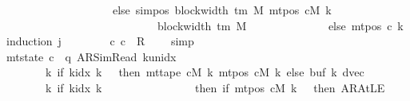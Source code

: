 \begin{isabellebody}
\ \ \ \ \ \ \ \ \ \ \ \ \ \ \ \ \ \ \ \ else\ sim{\isacharunderscore}{\kern0pt}pos\ {\isacharparenleft}{\kern0pt}block{\isacharunderscore}{\kern0pt}width\ {\isacharparenleft}{\kern0pt}{\isasymGamma}{\isacharunderscore}{\kern0pt}tm\ M{\isacharparenright}{\kern0pt}{\isacharparenright}{\kern0pt}\ {\isacharparenleft}{\kern0pt}mt{\isacharunderscore}{\kern0pt}pos\ cM\ k{\isacharparenright}{\kern0pt}\isanewline
\ \ \ \ \ \ \ \ \ \ \ \ \ \ \ \ \ \ \ \ \ \ \ \ \ \ \ {\isacharplus}{\kern0pt}\ block{\isacharunderscore}{\kern0pt}width\ {\isacharparenleft}{\kern0pt}{\isasymGamma}{\isacharunderscore}{\kern0pt}tm\ M{\isacharparenright}{\kern0pt}{\isacharparenright}{\kern0pt}\isanewline
\ \ \ \ \ \ \ \ \ \ \ \ \ \ else\ mt{\isacharunderscore}{\kern0pt}pos\ c{}\ k{\isacharparenright}{\kern0pt}{\isacharparenright}{\kern0pt}{\isachardoublequoteclose}\isanewline
%
\isadelimproof
%
\endisadelimproof
%
\isatagproof
{}\isamarkupfalse%
\ {\isacharparenleft}{\kern0pt}induction\ j{\isacharparenright}{\kern0pt}\isanewline
\ \ \isamarkupfalse%
\ {}\isanewline
\ \ \isamarkupfalse%
\ {\isachardoublequoteopen}{\isacharparenleft}{\kern0pt}c{}{\isacharcomma}{\kern0pt}\ c{}{\isacharparenright}{\kern0pt}\ {\isasymin}\ R{\isacharprime}{\kern0pt}\ {\isacharcircum}{\kern0pt}{\isacharcircum}{\kern0pt}\ {}{\isachardoublequoteclose}\ \isamarkupfalse%
\ simp\isanewline
\ \ \isamarkupfalse%
\ \isamarkupfalse%
\ {\isachardoublequoteopen}mt{\isacharunderscore}{\kern0pt}state\ c{}\ {\isacharequal}{\kern0pt}\ {\isacharparenleft}{\kern0pt}q{\isacharcomma}{\kern0pt}\ AR{\isacharunderscore}{\kern0pt}SimRead{\isacharcomma}{\kern0pt}\ k{\isacharunderscore}{\kern0pt}unidx\ {}{\isacharcomma}{\kern0pt}\ {}{\isacharcomma}{\kern0pt}\isanewline
\ \ \ \ \ \ \ \ {\isacharparenleft}{\kern0pt}{\isasymlambda}k{\isachardot}{\kern0pt}\ if\ k{\isacharunderscore}{\kern0pt}idx\ k\ {\isacharless}{\kern0pt}\ {}\ then\ mt{\isacharunderscore}{\kern0pt}tape\ cM\ k\ {\isacharparenleft}{\kern0pt}mt{\isacharunderscore}{\kern0pt}pos\ cM\ k{\isacharparenright}{\kern0pt}\ else\ buf{}\ k{\isacharparenright}{\kern0pt}{\isacharcomma}{\kern0pt}\ dvec{\isacharcomma}{\kern0pt}\isanewline
\ \ \ \ \ \ \ \ {\isacharparenleft}{\kern0pt}{\isasymlambda}k{\isachardot}{\kern0pt}\ if\ k{\isacharunderscore}{\kern0pt}idx\ k\ {\isacharless}{\kern0pt}\ {}\isanewline
\ \ \ \ \ \ \ \ \ \ \ \ \ \ then\ {\isacharparenleft}{\kern0pt}if\ mt{\isacharunderscore}{\kern0pt}pos\ cM\ k\ {\isacharequal}{\kern0pt}\ {}\ then\ AR{\isacharunderscore}{\kern0pt}AtLE\isanewline

\end{isabellebody}
